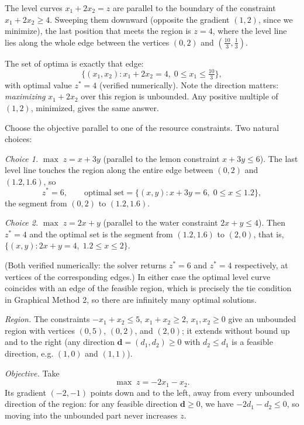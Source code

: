 The level curves $x_1 + 2x_2 = z$ are parallel to the boundary of the constraint $x_1 + 2x_2 \geq 4$. Sweeping them downward (opposite the gradient $(1,2)$, since we minimize), the last position that meets the region is $z = 4$, where the level line lies along the whole edge between the vertices $(0, 2)$ and $(\tfrac{10}{3}, \tfrac{1}{3})$.

The set of optima is exactly that edge:
\[
\{ (x_1, x_2) : x_1 + 2x_2 = 4,\; 0 \leq x_1 \leq \tfrac{10}{3} \},
\]
with optimal value $z^* = 4$ (verified numerically). Note the direction matters: \emph{maximizing} $x_1 + 2x_2$ over this region is unbounded. Any positive multiple of $(1,2)$, minimized, gives the same answer.

Choose the objective parallel to one of the resource constraints. Two natural choices:

\emph{Choice 1.} $\max\; z = x + 3y$ (parallel to the lemon constraint $x + 3y \leq 6$). The last level line touches the region along the entire edge between $(0,2)$ and $(1.2, 1.6)$, so
\[
z^* = 6, \qquad \text{optimal set} = \{ (x, y) : x + 3y = 6,\; 0 \leq x \leq 1.2 \},
\]
the segment from $(0,2)$ to $(1.2, 1.6)$.

\emph{Choice 2.} $\max\; z = 2x + y$ (parallel to the water constraint $2x + y \leq 4$). Then $z^* = 4$ and the optimal set is the segment from $(1.2, 1.6)$ to $(2, 0)$, that is, $\{ (x,y) : 2x + y = 4,\; 1.2 \leq x \leq 2 \}$.

(Both verified numerically: the solver returns $z^* = 6$ and $z^* = 4$ respectively, at vertices of the corresponding edges.) In either case the optimal level curve coincides with an edge of the feasible region, which is precisely the tie condition in Graphical Method 2, so there are infinitely many optimal solutions.

\emph{Region.} The constraints $-x_1 + x_2 \leq 5$, $x_1 + x_2 \geq 2$, $x_1, x_2 \geq 0$ give an unbounded region with vertices $(0,5)$, $(0,2)$, and $(2,0)$; it extends without bound up and to the right (any direction $\mathbf d = (d_1, d_2) \geq 0$ with $d_2 \leq d_1$ is a feasible direction, e.g. $(1,0)$ and $(1,1)$).

\emph{Objective.} Take
\[
\max\; z = -2x_1 - x_2.
\]
Its gradient $(-2,-1)$ points down and to the left, away from every unbounded direction of the region: for any feasible direction $\mathbf d \geq 0$, we have $-2d_1 - d_2 \leq 0$, so moving into the unbounded part never increases $z$.


